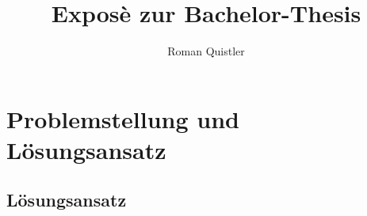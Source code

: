 \documentclass[a4paper, 11pt]{scrartcl}
\title{Exposè zur Bachelor-Thesis}
\author{Roman Quistler}
\begin{document}
	
	
	
	\newpage
	\tableofcontents
	\newpage
	
	
	
	\section{Problemstellung und Lösungsansatz}
	\label{sec:problemstellung-lösungsansatz}
	
	
	
	\subsection{Lösungsansatz}
	
	\newpage
	
	\begin{appendix}
		\listoffigures
	\end{appendix}
	
	\printbibliography
	
\end{document}
